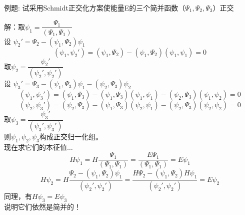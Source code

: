 \begin{frame} [allowframebreaks=]
    \frametitle{}
    \begin{tcolorbox2}{例题:}
       试采用Schmidt正交化方案使能量E的三个简并函数（$\Psi_1, \Psi_2, \Psi_3$）正交
     \end{tcolorbox2}
    \alert{解：}取$\psi_1=\dfrac{\Psi_1}{(\Psi_1, \Psi_1)}$\\
    设 $\psi_2'=\Psi_2-(\psi_1, \Psi_2)\psi_1$\\
    \begin{equation*}
        (\psi_1, \psi_2')=(\psi_1, \Psi_2)-(\psi_1, \Psi_2)(\psi_1, \psi_1)=0
    \end{equation*}  
    取$\psi_2=\dfrac{\psi_2'}{(\psi_2', \psi_2')}$\\
    设 $\psi_3'=\Psi_3-(\psi_1, \Psi_3)\psi_1-(\psi_2, \Psi_3)\psi_2$\\
    \begin{equation*}
        (\psi_1, \psi_3')=(\psi_1, \Psi_3)-(\psi_1, \Psi_3)(\psi_1, \psi_1)-(\psi_2, \Psi_3)(\psi_1, \psi_2)=0
    \end{equation*}
    \begin{equation*}
        (\psi_2, \psi_3')=(\psi_2, \Psi_3)-(\psi_1, \Psi_3)(\psi_2, \psi_1)-(\psi_2, \Psi_3)(\psi_2, \psi_2)=0
    \end{equation*}
    取$\psi_3=\dfrac{\psi_3'}{(\psi_3', \psi_3')}$\\
    则$\psi_1, \psi_2, \psi_3$构成正交归一化组。\\
    现在求它们的本征值$\dots$\\
    $$ H\psi_1= H \dfrac{\Psi_1}{(\Psi_1, \Psi_1)} =  \dfrac{E\Psi_1}{(\Psi_1, \Psi_1)} = E \psi_1$$
    $$ H\psi_2= H \dfrac{\Psi_2-(\psi_1, \Psi_2)\psi_1}{(\psi_2', \psi_2')} =  \dfrac{H\Psi_2-(\psi_1, \Psi_2)H\psi_1}{(\psi_2', \psi_2')}=E\psi_2$$
    同理，有$ H\psi_3=E\psi_3$\\
    说明它们依然是简并的！
\end{frame} 

